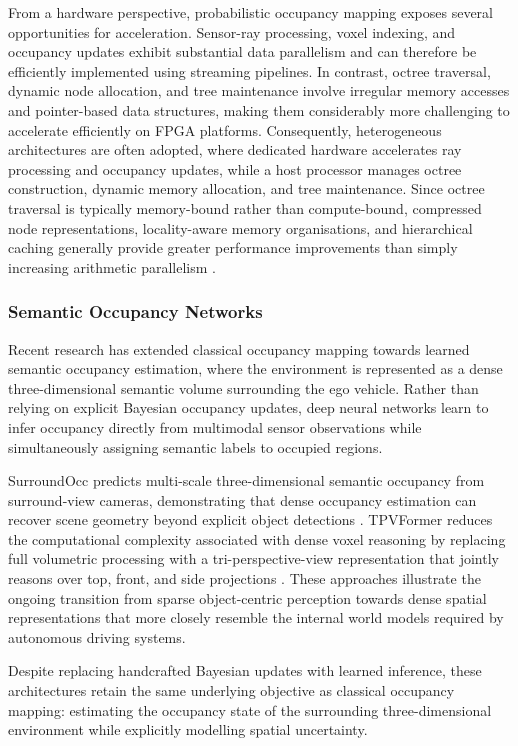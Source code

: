 \documentclass{ieeeaccess}
\begin{document}
From a hardware perspective, probabilistic occupancy mapping exposes several opportunities for acceleration. Sensor-ray processing, voxel indexing, and occupancy updates exhibit substantial data parallelism and can therefore be efficiently implemented using streaming pipelines. In contrast, octree traversal, dynamic node allocation, and tree maintenance involve irregular memory accesses and pointer-based data structures, making them considerably more challenging to accelerate efficiently on FPGA platforms. Consequently, heterogeneous architectures are often adopted, where dedicated hardware accelerates ray processing and occupancy updates, while a host processor manages octree construction, dynamic memory allocation, and tree maintenance. Since octree traversal is typically memory-bound rather than compute-bound, compressed node representations, locality-aware memory organisations, and hierarchical caching generally provide greater performance improvements than simply increasing arithmetic parallelism \cite{jia2022_omu}.

\subsubsection{Semantic Occupancy Networks}

Recent research has extended classical occupancy mapping towards learned semantic occupancy estimation, where the environment is represented as a dense three-dimensional semantic volume surrounding the ego vehicle. Rather than relying on explicit Bayesian occupancy updates, deep neural networks learn to infer occupancy directly from multimodal sensor observations while simultaneously assigning semantic labels to occupied regions.

SurroundOcc predicts multi-scale three-dimensional semantic occupancy from surround-view cameras, demonstrating that dense occupancy estimation can recover scene geometry beyond explicit object detections \cite{wei2023_surroundocc}. TPVFormer reduces the computational complexity associated with dense voxel reasoning by replacing full volumetric processing with a tri-perspective-view representation that jointly reasons over top, front, and side projections \cite{huang2023_tpvformer}. These approaches illustrate the ongoing transition from sparse object-centric perception towards dense spatial representations that more closely resemble the internal world models required by autonomous driving systems.

Despite replacing handcrafted Bayesian updates with learned inference, these architectures retain the same underlying objective as classical occupancy mapping: estimating the occupancy state of the surrounding three-dimensional environment while explicitly modelling spatial uncertainty.
\end{document}
